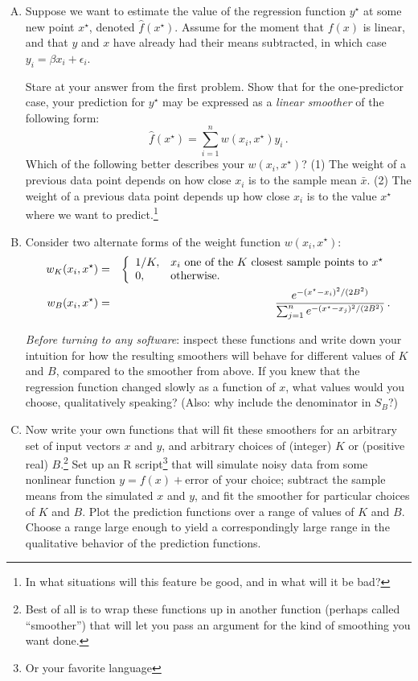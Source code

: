 \documentclass{mynotes}
\begin{document}
\begin{enumerate}[(A)]
\item Suppose we want to estimate the value of the regression function $y^{\star}$ at some new point $x^\star$, denoted $\hat{f}(x^{\star})$.  Assume for the moment that $f(x)$ is linear, and that $y$ and $x$ have already had their means subtracted, in which case $y_i = \beta x_i + \epsilon_i$.

Stare at your answer from the first problem.  Show that for the one-predictor case, your prediction for $y^{\star}$ may be expressed as a \textit{linear smoother} of the following form:
$$
\hat{f}(x^{\star}) = \sum_{i=1}^n w(x_i, x^{\star}) y_i \, .
$$
Which of the following better describes your $w(x_i, x^{\star})$? (1) The weight of a previous data point depends on how close $x_i$ is to the sample mean $\bar{x}$.  (2) The weight of a previous data point depends up how close $x_i$ is to the value $x^{\star}$ where we want to predict.\footnote{In what situations will this feature be good, and in what will it be bad?}

\item Consider two alternate forms of the weight function $w(x_i, x^{\star})$:
\begin{eqnarray*}
w_K(x_i, x^{\star}) &=& \left \{
\begin{array}{l l}
1/K, & \mbox{$x_i$ one of the $K$ closest sample points to $x^{\star}$} \\
0, & \mbox{otherwise.} \\
\end{array}
\right. \\
w_B(x_i, x^{\star}) &=& \frac{ e^{-(x^{\star} - x_i)^2/(2 B^2)} }{\sum_{j=1}^n e^{-(x^{\star} - x_j)^2/(2 B^2)}} \, .
\end{eqnarray*}

\textit{Before turning to any software}: inspect these functions and write down your intuition for how the resulting smoothers will behave for different values of $K$ and $B$, compared to the smoother from above. If you knew that the regression function changed slowly as a function of $x$, what values would you choose, qualitatively speaking?  (Also: why include the denominator in $S_B$?)

\item Now write your own functions that will fit these smoothers for an arbitrary set of input vectors $x$ and $y$, and arbitrary choices of (integer) $K$ or (positive real) $B$.\footnote{Best of all is to wrap these functions up in another function (perhaps called ``smoother'') that will let you pass an argument for the kind of smoothing you want done.}  Set up an R script\footnote{Or your favorite language} that will simulate noisy data from some nonlinear function $y = f(x) + \mbox{error}$ of your choice; subtract the sample means from the simulated $x$ and $y$, and fit the smoother for particular choices of $K$ and $B$.  Plot the prediction functions over a range of values of $K$ and $B$.  Choose a range large enough to yield a correspondingly large range in the qualitative behavior of the prediction functions.

\end{enumerate}
\end{document}

